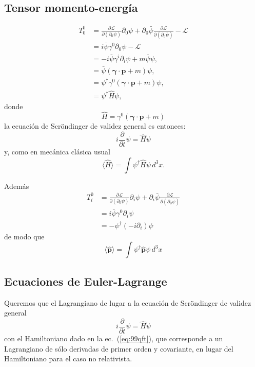 \subsection{Tensor momento-energía}
\label{sec:tens-momento-energi}
\begin{align}
  T^0_0&=\frac{\partial\mathcal{L}}{\partial\left(\partial_0\psi\right)}\partial_0\psi+\partial_0\bar{\psi}\frac{\partial\mathcal{L}}{\partial\left(\partial_0\bar{\psi}\right)}-\mathcal{L}\nonumber\\
  &=i\bar{\psi}\gamma^0\partial_0\psi-\mathcal{L}\nonumber\\
  &=-i\bar{\psi}\gamma^i\partial_i\psi+m\bar{\psi} \psi,\nonumber\\
  &=\bar{\psi}(\boldsymbol{\gamma}\cdot\mathbf{p}+m)\psi,\nonumber\\
  &=\psi^\dagger \gamma^0(\boldsymbol{\gamma}\cdot\mathbf{p}+m)\psi,\nonumber\\
  \label{eq:118qft}
  &=\psi^\dagger\hat{H} \psi,
\end{align}
donde
\begin{equation}
  \label{eq:denshal}
  \hat{H}= \gamma^0(\boldsymbol{\gamma}\cdot\mathbf{p}+m)
\end{equation}
la ecuación de Scröndinger de validez general es entonces:
\begin{equation}
  i\frac{\partial}{\partial t}\psi=\hat{H} \psi
\end{equation}
y, como en mecánica clásica usual
\begin{equation}
  \label{eq:99qft}
  \langle\hat{H}\rangle=\int \psi^\dagger\hat{H} \psi\,d^3x.
\end{equation}


Además
\begin{align}
    T^0_i&=\frac{\partial\mathcal{L}}{\partial\left(\partial_0\psi\right)}\partial_i\psi+\partial_i\bar{\psi}\frac{\partial\mathcal{L}}{\partial\left(\partial_0\bar{\psi}\right)}\nonumber\\
    &=i\bar{\psi}\gamma^0 \partial_i\psi\nonumber\\
    &=-\psi^\dagger(-i\partial_i)\psi
\end{align}
de modo que
\begin{equation}
  \langle\hat{\mathbf{p}}\rangle=\int\psi^\dagger\hat{\mathbf{p}}\psi\,d^3 x
\end{equation}
\subsection{Ecuaciones de Euler-Lagrange}
\label{sec:ecuaciones-de-euler}
Queremos que el Lagrangiano de lugar a la ecuación de Scröndinger de validez general
\begin{equation}
  \label{eq:grlsch}
  i\frac{\partial}{\partial t}\psi=\hat{H} \psi
\end{equation}
con el Hamiltoniano dado en la ec.~(\ref{eq:99qft}), que corresponde a un Lagrangiano de sólo derivadas de primer orden y covariante, en lugar del Hamiltoniano para el caso no relativista. 

